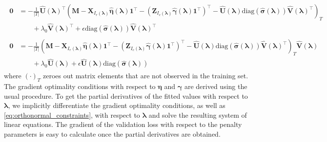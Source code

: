 \documentclass[12pt,letterpaper]{article}
\begin{document}
\begin{align}
\begin{split}
\boldsymbol{0} & = 
- \frac{1}{|T|} 
\hat{\boldsymbol{U}}(\boldsymbol{\lambda})^\top
\left (
\boldsymbol{M} 
- \boldsymbol{X}_{I_r(\boldsymbol{\lambda})} \hat{\boldsymbol{\eta}}(\boldsymbol{\lambda}) \boldsymbol{1}^\top 
- (\boldsymbol{Z}_{I_c(\boldsymbol{\lambda})} \hat{\boldsymbol{\gamma}}(\boldsymbol{\lambda})  \boldsymbol{1}^\top )^\top
- \hat{\boldsymbol{U}}(\boldsymbol{\lambda})\text{diag}(\hat{\boldsymbol{\sigma}}(\boldsymbol{\lambda})) \hat{\boldsymbol{V}}(\boldsymbol{\lambda})^\top
\right )_T
\\
& \qquad + \lambda_0 \hat{\boldsymbol{V}}(\boldsymbol{\lambda})^\top
+ \epsilon \text{diag}(\hat{\boldsymbol{\sigma}}(\boldsymbol{\lambda})) \hat{\boldsymbol{V}}(\boldsymbol{\lambda})^\top
\end{split}
\label{eq:grad_opt_matrix_left}
\\
\begin{split}
\boldsymbol{0} & = - \frac{1}{|T|} 
\left (
\boldsymbol{M} 
- \boldsymbol{X}_{I_r(\boldsymbol{\lambda})} \hat{\boldsymbol{\eta}}(\boldsymbol{\lambda}) \boldsymbol{1}^\top 
- (\boldsymbol{Z}_{I_c(\boldsymbol{\lambda})} \hat{\boldsymbol{\gamma}}(\boldsymbol{\lambda})  \boldsymbol{1}^\top )^\top
- \hat{\boldsymbol{U}}(\boldsymbol{\lambda})\text{diag}(\hat{\boldsymbol{\sigma}}(\boldsymbol{\lambda})) \hat{\boldsymbol{V}}(\boldsymbol{\lambda})^\top
\right )_T
\hat{\boldsymbol{V}}(\boldsymbol{\lambda})
\\
& \qquad + \lambda_0 \hat{\boldsymbol{U}}(\boldsymbol{\lambda})
+ \epsilon \hat{\boldsymbol{U}}(\boldsymbol{\lambda}) \text{diag}(\hat{\boldsymbol{\sigma}}(\boldsymbol{\lambda}))
\end{split}
\label{eq:grad_opt_matrix_comp}
\end{align}
where $(\cdot)_T$ zeroes out matrix elements that are not observed in the training set. The gradient optimality conditions with respect to $\boldsymbol{\eta}$ and $\boldsymbol{\gamma}$ are derived using the usual procedure. To get the partial derivatives of the fitted values with respect to $\boldsymbol{\lambda}$, we implicitly differentiate the gradient optimality conditions, as well as \eqref{eq:orthonormal_constraints}, with respect to $\boldsymbol{\lambda}$ and solve the resulting system of linear equations. The gradient of the validation loss with respect to the penalty parameters is easy to calculate once the partial derivatives are obtained.
\end{document}

